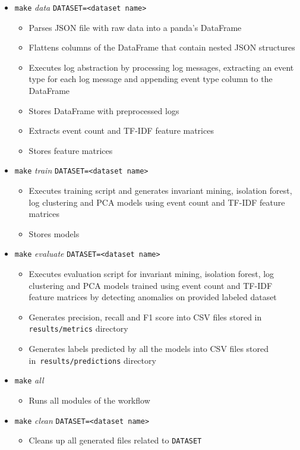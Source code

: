  \begin{itemize}
     \item \texttt{make} \textit{data} \texttt{DATASET=<dataset name>}
     \begin{itemize}
         \item Parses JSON file with raw data into a panda's DataFrame
         \item Flattens columns of the DataFrame that contain nested JSON structures
         \item Executes log abstraction by processing log messages, extracting an event type for each log message and appending event type column to the DataFrame
         \item Stores DataFrame with preprocessed logs 
         \item Extracts event count and TF-IDF feature matrices
         \item Stores feature matrices
     \end{itemize}
     \item \texttt{make} \textit{train} \texttt{DATASET=<dataset name>}
     \begin{itemize}
         \item Executes training script and generates invariant mining, isolation forest, log clustering and PCA models using event count and TF-IDF feature matrices
         \item Stores models
     \end{itemize}
     \item \texttt{make} \textit{evaluate} \texttt{DATASET=<dataset name>}
     \begin{itemize}
         \item Executes evaluation script for invariant mining, isolation forest, log clustering and PCA models trained using event count and TF-IDF feature matrices by detecting anomalies on provided labeled dataset
         \item Generates precision, recall and F1 score into CSV files stored in \texttt{\justify results/metrics} directory
         \item Generates labels predicted by all the models into CSV files stored in~\texttt{results/predictions} directory
     \end{itemize}
     \item \texttt{make} \textit{all} 
     \begin{itemize}
         \item Runs all modules of the workflow
     \end{itemize}
     \item \texttt{make} \textit{clean} \texttt{DATASET=<dataset name>}
     \begin{itemize}
         \item Cleans up all generated files related to \texttt{DATASET}
     \end{itemize}
 \end{itemize}
 
